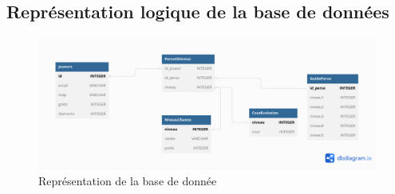 \subsection{Représentation logique de la base de données}

    \begin{figure}[ht!]
        \centering
            \includegraphics[width=1\textwidth]{images/bd.png}
        \caption{Représentation de la base de donnée}
    \end{figure}
